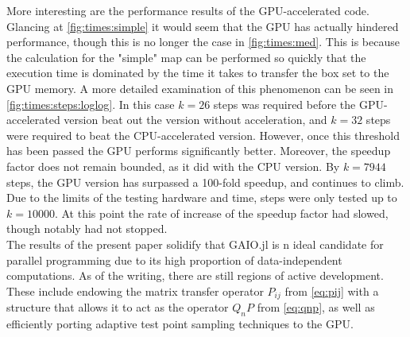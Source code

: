 More interesting are the performance results of the GPU-accelerated code. Glancing at 
\autoref{fig:times:simple} it would seem that the GPU has actually hindered 
performance, though this is no longer the case in \autoref{fig:times:med}. This is 
because the calculation for the "simple" map can be performed so quickly that the 
execution time is dominated by the time it takes to transfer the box set to the GPU 
memory. A more detailed examination of this phenomenon can be seen in 
\autoref{fig:times:steps:loglog}. In this case $k = 26$ steps was required before the 
GPU-accelerated version beat out the version without acceleration, and $k = 32$ steps were 
required to beat the CPU-accelerated version. However, once this threshold has been 
passed the GPU performs significantly better. Moreover, the speedup factor does not remain 
bounded, as it did with the CPU version. By $k = 7944$ steps, the GPU version has 
surpassed a 100-fold speedup, and continues to climb. Due to the limits of the testing 
hardware and time, steps were only tested up to $k = 10000$. At this point the rate of 
increase of the speedup factor had slowed, though notably had not stopped. \\

The results of the present paper solidify that GAIO.jl is n ideal candidate for 
parallel programming due to its high proportion of data-independent computations. As of 
the writing, there are still regions of active development. These include endowing the 
matrix transfer operator $P_{ij}$ from \autoref{eq:pij} with a structure that allows it to 
act as the operator $Q_n P$ from \autoref{eq:qnp}, as well as 
efficiently porting adaptive test point sampling techniques to the GPU. 

